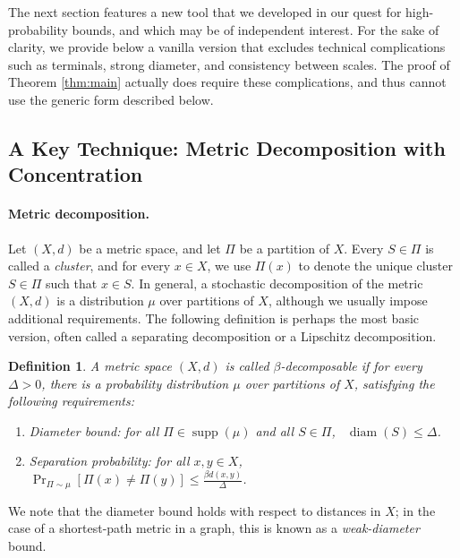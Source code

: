 \documentclass[twoside,leqno,twocolumn]{article}
\newtheorem{definition}[Definition]{Definition}
\newtheorem{definition}[theorem]{Definition}
\DeclareMathOperator{\supp}{supp}
\DeclareMathOperator{\diam}{diam}
\def\compactify{\itemsep=0pt \topsep=0pt \partopsep=0pt \parsep=0pt}
\begin{document}
The next section features a new tool that we developed in our quest 
for high-probability bounds, and which may be of independent interest.
For the sake of clarity, we provide below  
a vanilla version that excludes technical complications 
such as terminals, strong diameter, and consistency between scales.
The proof of Theorem \ref{thm:main} actually does require these complications, 
and thus cannot use the generic form described below.


\subsection{A Key Technique: Metric Decomposition with Concentration} \label{sec:techniques}

\paragraph{Metric decomposition.}

Let $(X,d)$ be a metric space, and let $\Pi$ be a partition of $X$.
Every $S \in \Pi$ is called a {\em cluster},
and for every $x\in X$, we use $\Pi(x)$ to denote the unique cluster 
$S \in \Pi$ such that $x \in S$.
In general, a stochastic decomposition of the metric $(X,d)$ 
is a distribution $\mu$ over partitions of $X$,
although we usually impose additional requirements.
The following definition is perhaps the most basic version,
often called a separating decomposition or a Lipschitz decomposition.

\begin{definition}\label{def:beta}
A metric space $(X,d)$ is called {\em $\beta$-decomposable} 
if for every $\Delta>0$, there is a probability distribution $\mu$ over 
partitions of $X$, satisfying the following requirements:
\begin{enumerate} \compactify
\renewcommand{\theenumi}{\emph{(\alph{enumi})}}
\item \label{it:DiameterBound}
Diameter bound: for all $\Pi \in \supp(\mu)$ and all $S\in \Pi$, 
  \ $\diam(S) \le \Delta$. 
\item \label{it:SeparatingProb}
Separation probability: for all $x,y \in X$,
  \ $\displaystyle\Pr_{\Pi \sim \mu}[\Pi(x) \ne \Pi(y)] \le \tfrac{\beta d(x,y)}{\Delta}$.
\end{enumerate}
\end{definition}
We note that the diameter bound holds with respect to distances in $X$;
in the case of a shortest-path metric in a graph, 
this is known as a {\em weak-diameter} bound.
\end{document}
